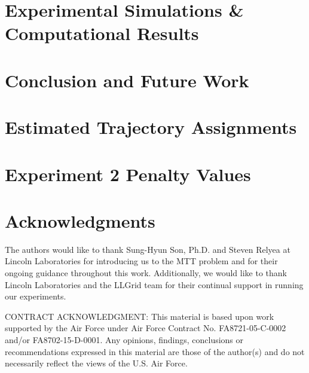 \documentclass[journal]{IEEEtran}
\begin{document}
\section{Experimental Simulations \& Computational Results}\label{sec:Results}


\section{Conclusion and Future Work}\label{sec:Conclusion}


\appendices

\section{Estimated Trajectory Assignments}\label{sec:Assignment_Appendix}


\section{Experiment 2 Penalty Values}\label{sec:Penalty_Appendix}


\section*{Acknowledgments}
The authors would like to thank Sung-Hyun Son, Ph.D. and Steven Relyea at Lincoln Laboratories for introducing us to the MTT problem and for their ongoing guidance throughout this work. Additionally, we would like to thank Lincoln Laboratories and the LLGrid team for their continual support in running our experiments. 

CONTRACT ACKNOWLEDGMENT: This material is based upon work supported by the Air Force under Air Force Contract No. FA8721-05-C-0002 and/or FA8702-15-D-0001. Any opinions, findings, conclusions or recommendations expressed in this material are those of the author(s) and do not necessarily reflect the views of the U.S. Air Force. 







%

\end{document}
